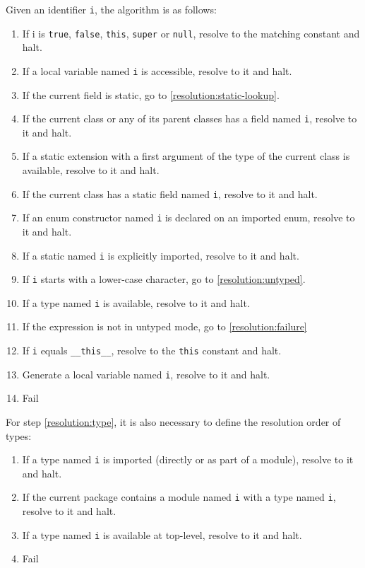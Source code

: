 \documentclass[a4paper,oneside]{book}
\newcommand{\expr}[1]{\texttt{#1}}
\begin{document}
Given an identifier \expr{i}, the algorithm is as follows:

\begin{enumerate}
	\item If i is \expr{true}, \expr{false}, \expr{this}, \expr{super} or \expr{null}, resolve to the matching constant and halt.
	\item If a local variable named \expr{i} is accessible, resolve to it and halt.
	\item If the current field is static, go to \ref{resolution:static-lookup}.
	\item If the current class or any of its parent classes has a field named \expr{i}, resolve to it and halt.
	\item\label{resolution:static-extension} If a static extension with a first argument of the type of the current class is available, resolve to it and halt.
	\item\label{resolution:static-lookup} If the current class has a static field named \expr{i}, resolve to it and halt.
	\item\label{resolution:enum-ctor} If an enum constructor named \expr{i} is declared on an imported enum, resolve to it and halt.
	\item If a static named \expr{i} is explicitly imported, resolve to it and halt.
	\item If \expr{i} starts with a lower-case character, go to \ref{resolution:untyped}.
	\item\label{resolution:type} If a type named \expr{i} is available, resolve to it and halt.
	\item\label{resolution:untyped} If the expression is not in untyped mode, go to \ref{resolution:failure}
	\item If \expr{i} equals \expr{__this__}, resolve to the \expr{this} constant and halt.
	\item Generate a local variable named \expr{i}, resolve to it and halt.
	\item\label{resolution:failure} Fail
\end{enumerate}

For step \ref{resolution:type}, it is also necessary to define the resolution order of types:

\begin{enumerate}
	\item\label{resolution:import} If a type named \expr{i} is imported (directly or as part of a module), resolve to it and halt.
	\item If the current package contains a module named \expr{i} with a type named \expr{i}, resolve to it and halt.
	\item If a type named \expr{i} is available at top-level, resolve to it and halt.
	\item Fail
\end{enumerate}
\end{document}
